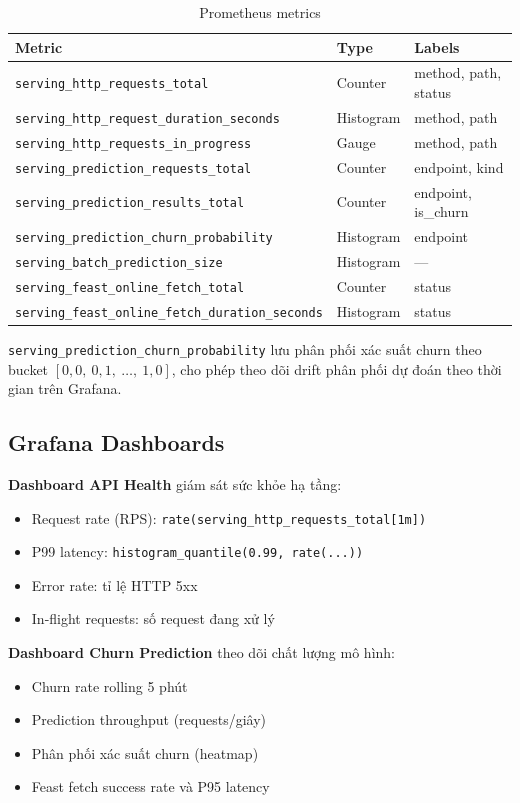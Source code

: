\documentclass[conference]{IEEEtran}
\begin{document}
\begin{table}[htbp]
\caption{Prometheus metrics}
\label{tab:metrics}
\centering
\small
\begin{tabular}{p{4cm}lp{2.5cm}}
\toprule
\textbf{Metric} & \textbf{Type} & \textbf{Labels} \\
\midrule
\texttt{serving\_http\_requests\_total} & Counter & method, path, status \\
\texttt{serving\_http\_request\_duration\_seconds} & Histogram & method, path \\
\texttt{serving\_http\_requests\_in\_progress} & Gauge & method, path \\
\texttt{serving\_prediction\_requests\_total} & Counter & endpoint, kind \\
\texttt{serving\_prediction\_results\_total} & Counter & endpoint, is\_churn \\
\texttt{serving\_prediction\_churn\_probability} & Histogram & endpoint \\
\texttt{serving\_batch\_prediction\_size} & Histogram & — \\
\texttt{serving\_feast\_online\_fetch\_total} & Counter & status \\
\texttt{serving\_feast\_online\_fetch\_duration\_seconds} & Histogram & status \\
\bottomrule
\end{tabular}
\end{table}

\texttt{serving\_prediction\_churn\_probability} lưu phân phối xác suất churn
theo bucket $[0{,}0,\ 0{,}1,\ \ldots,\ 1{,}0]$, cho phép theo dõi drift
phân phối dự đoán theo thời gian trên Grafana.

\subsection{Grafana Dashboards}

\textbf{Dashboard API Health} giám sát sức khỏe hạ tầng:
\begin{itemize}
  \item Request rate (RPS): \texttt{rate(serving\_http\_requests\_total[1m])}
  \item P99 latency: \texttt{histogram\_quantile(0.99, rate(...))}
  \item Error rate: tỉ lệ HTTP 5xx
  \item In-flight requests: số request đang xử lý
\end{itemize}

\textbf{Dashboard Churn Prediction} theo dõi chất lượng mô hình:
\begin{itemize}
  \item Churn rate rolling 5 phút
  \item Prediction throughput (requests/giây)
  \item Phân phối xác suất churn (heatmap)
  \item Feast fetch success rate và P95 latency
\end{itemize}
\end{document}

